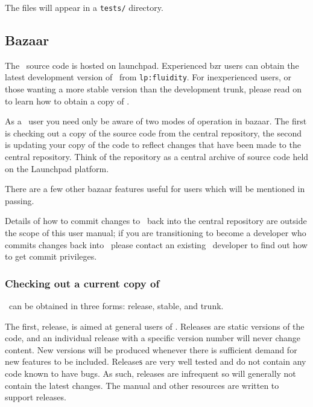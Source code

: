 The files will appear in a \lstinline[language=Bash]+tests/+ directory.

\subsection{Bazaar}
\label{sec:bazaar}

The \fluidity\ source code is hosted on launchpad. Experienced bzr users can
obtain the latest development version of \fluidity\ from
\lstinline[language=Bash]+lp:fluidity+. For inexperienced users, or those
wanting a more stable version than the development trunk, please read on to
learn how to obtain a copy of \fluidity.

As a \fluidity\ user you need only be aware of two modes of operation in
bazaar. The first is checking out a copy of the source code from the
central repository, the second is updating your copy of the code to reflect
changes that have been made to the central repository. Think of the repository
as a central archive of source code held on the Launchpad platform.

There are a few other bazaar features useful for users which will be mentioned
in passing.

Details of how to commit changes to \fluidity\ back into the central repository
are outside the scope of this user manual; if you are transitioning to become a
developer who commits changes back into \fluidity\ please contact an existing
\fluidity\ developer to find out how to get commit privileges.

\subsubsection{Checking out a current copy of \fluidity}
\label{sec:subversion_checkout_current}

\fluidity\ can be obtained in three forms: release, stable, and trunk.

The first, release, is aimed at general users of \fluidity. Releases are static
versions of the code, and an individual release with a specific version number
will never change content. New versions will be produced whenever there is
sufficient demand for new features to be included. Releaseѕ are very well
tested and do not contain any code known to have bugs. As such, releases are
infrequent so will generally not contain the latest changes. The manual and
other resources are written to support releases.

